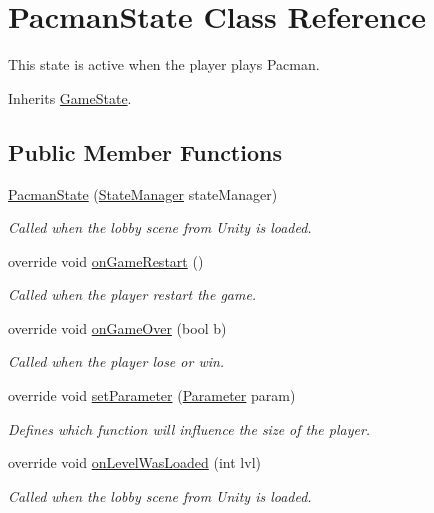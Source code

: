 \hypertarget{class_pacman_state}{\section{Pacman\-State Class Reference}
\label{class_pacman_state}
}


This state is active when the player plays Pacman. 




Inherits \hyperlink{class_game_state}{Game\-State}.

\subsection*{Public Member Functions}
\begin{DoxyCompactItemize}
\item 
\hyperlink{class_pacman_state_aff25890a3619944f39d765b4366c0f3d}{Pacman\-State} (\hyperlink{class_state_manager}{State\-Manager} state\-Manager)
\begin{DoxyCompactList}\small\item\em Called when the lobby scene from Unity is loaded.\end{DoxyCompactList}\item 
override void \hyperlink{class_pacman_state_ae35ff219ed10e129d3c9e4f984b2c783}{on\-Game\-Restart} ()
\begin{DoxyCompactList}\small\item\em Called when the player restart the game.\end{DoxyCompactList}\item 
override void \hyperlink{class_pacman_state_a96bdcf9e030e2ecf5bc2d9b1307c5d81}{on\-Game\-Over} (bool b)
\begin{DoxyCompactList}\small\item\em Called when the player lose or win.\end{DoxyCompactList}\item 
override void \hyperlink{class_pacman_state_a3aff55fbc007a6f89dc5b344ab661124}{set\-Parameter} (\hyperlink{class_parameter}{Parameter} param)
\begin{DoxyCompactList}\small\item\em Defines which function will influence the size of the player.\end{DoxyCompactList}\item 
override void \hyperlink{class_pacman_state_a84279e9d0ad1d9b60c8e2d737fd732f3}{on\-Level\-Was\-Loaded} (int lvl)
\begin{DoxyCompactList}\small\item\em Called when the lobby scene from Unity is loaded.\end{DoxyCompactList}\item 

\end{DoxyCompactItemize}
